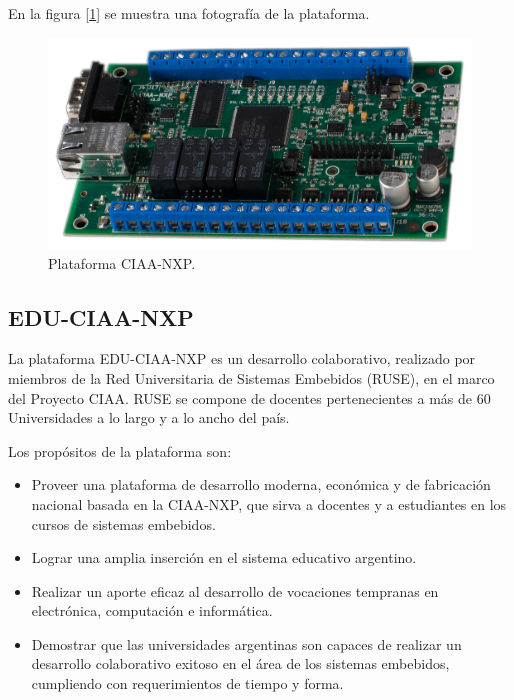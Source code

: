 \noindent En la figura [\ref{fig:ciaaNxp}] se muestra una fotografía de la plataforma.

\begin{figure}[!htbp]
\begin{center}  %
\includegraphics*[width=\textwidth]{Figures/CIAA-NXP_Foto.png}
\par\caption{Plataforma CIAA-NXP.}\label{fig:ciaaNxp}
\end{center}
\end{figure}



\subsection{EDU-CIAA-NXP}

La plataforma EDU-CIAA-NXP es un desarrollo colaborativo, realizado por miembros de la Red Universitaria de Sistemas Embebidos (RUSE), en el marco del Proyecto CIAA. RUSE se compone de docentes pertenecientes a más de 60 Universidades a lo largo y a lo ancho del país. 

\medskip

\noindent Los propósitos de la plataforma son: 

\begin{itemize}
\item
Proveer una plataforma de desarrollo moderna, económica y de fabricación nacional basada en la CIAA-NXP, que sirva a docentes y a estudiantes en los cursos de sistemas embebidos.
\item
Lograr una amplia inserción en el sistema educativo argentino.
\item
Realizar un aporte eficaz al desarrollo de vocaciones tempranas en electrónica, computación e informática.
\item
Demostrar que las universidades argentinas son capaces de realizar un desarrollo colaborativo exitoso en el área de los sistemas embebidos, cumpliendo con requerimientos de tiempo y forma.
\end{itemize}

